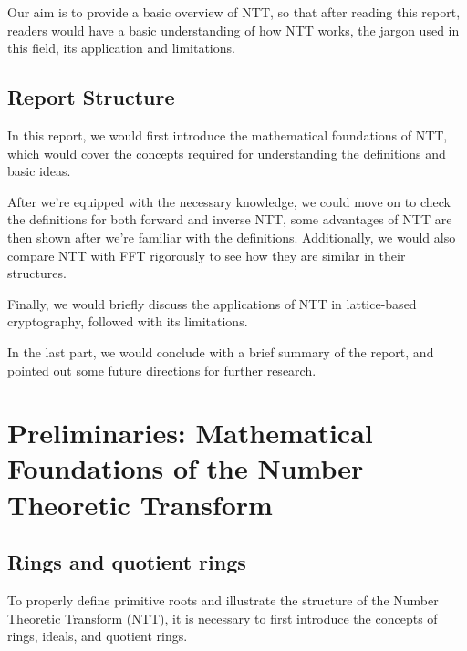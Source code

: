 \documentclass[12pt]{article}
\begin{document}
Our aim is to provide a basic overview of NTT, 
so that after reading this report, 
readers would have a basic understanding of 
how NTT works, the jargon used in this field, its application and limitations.



\subsection{Report Structure}

In this report, 
we would first introduce the mathematical foundations of NTT, 
which would cover the concepts required for understanding the definitions and basic ideas.

After we're equipped with the necessary knowledge, 
we could move on to check the definitions for both forward and inverse NTT, 
some advantages of NTT are then shown after we're familiar with the definitions.
Additionally, we would also compare NTT with FFT rigorously to see how they are similar in their structures.

Finally, we would briefly discuss the applications of NTT in lattice-based cryptography, 
followed with its limitations.

In the last part, 
we would conclude with a brief summary of the report, 
and pointed out some future directions for further research.

\section{Preliminaries: Mathematical Foundations of the Number Theoretic Transform}

\subsection{Rings and quotient rings}

To properly define primitive roots and illustrate the structure of the Number Theoretic Transform (NTT), 
it is necessary to first introduce the concepts of rings, ideals, and quotient rings. 
\end{document}
